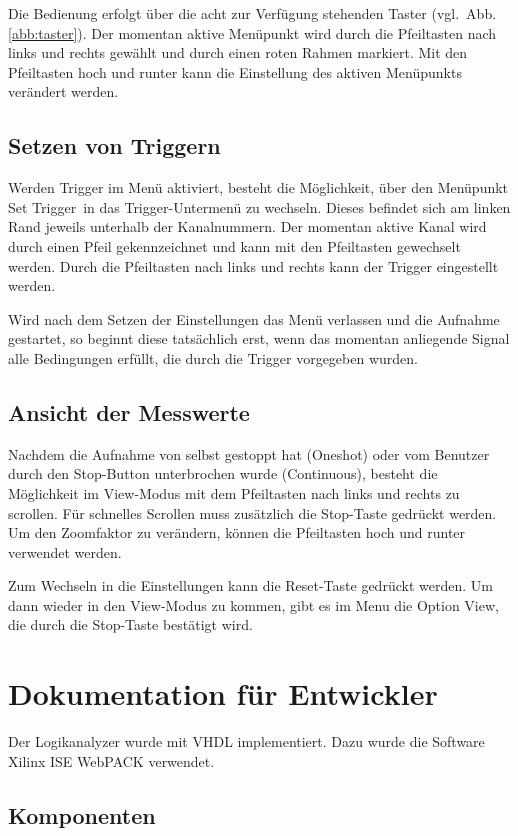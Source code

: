 \documentclass[IN,ngerman,utf8,12pt]{tumbook}
\newcommand{\vgl}{vgl.\ }
\begin{document}
Die Bedienung erfolgt über die acht zur Verfügung stehenden Taster (\vgl Abb. \ref{abb:taster}).
Der momentan aktive Menüpunkt wird durch die Pfeiltasten nach links und rechts gewählt und durch einen roten Rahmen markiert. Mit den Pfeiltasten hoch und runter kann die Einstellung des aktiven Menüpunkts verändert werden.

\section{Setzen von Triggern}

Werden Trigger im Menü aktiviert, besteht die Möglichkeit, über den Menüpunkt \glqq Set Trigger\grqq\  in das Trigger-Untermenü zu wechseln. Dieses befindet sich am linken Rand jeweils unterhalb der Kanalnummern. Der momentan aktive Kanal wird durch einen Pfeil gekennzeichnet und kann mit den Pfeiltasten gewechselt werden. Durch die Pfeiltasten nach links und rechts kann der Trigger eingestellt werden.

Wird nach dem Setzen der Einstellungen das Menü verlassen und die Aufnahme gestartet, so beginnt diese tatsächlich erst, wenn das momentan anliegende Signal alle Bedingungen erfüllt, die durch die Trigger vorgegeben wurden.

\section{Ansicht der Messwerte}
Nachdem die Aufnahme von selbst gestoppt hat (Oneshot) oder vom Benutzer durch den Stop-Button unterbrochen wurde (Continuous), besteht die Möglichkeit im \glqq View\grqq-Modus mit dem Pfeiltasten nach links und rechts zu scrollen.
Für schnelles Scrollen muss zusätzlich die Stop-Taste gedrückt werden.
Um den Zoomfaktor zu verändern, können die Pfeiltasten hoch und runter verwendet werden.

Zum Wechseln in die Einstellungen kann die Reset-Taste gedrückt werden.
Um dann wieder in den \glqq View\grqq-Modus zu kommen, gibt es im Menu die Option \glqq View\grqq, die durch die Stop-Taste bestätigt wird.

\chapter{Dokumentation für Entwickler}

Der Logikanalyzer wurde mit VHDL implementiert.
Dazu wurde die Software Xilinx ISE WebPACK verwendet.

\section{Komponenten}
\end{document}
